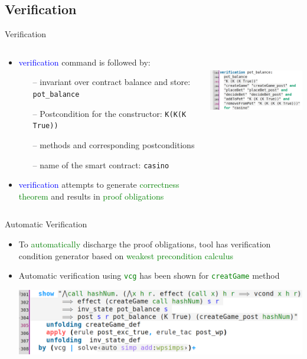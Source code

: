 \documentclass[aspectratio=169]{beamer}
\begin{document}
\subsection{Verification}
\begin{frame}{Verification}
\begin{columns}
\begin{column}{0.50\textwidth}
  \begin{itemize}
\item \textcolor{blue}{verification} command is followed by:
\begin{itemize}
\item[--] invariant over contract balance and store: \texttt{pot\_balance} 
\item[--] Postcondition for the constructor: \texttt{K(K(K True))}
\item[--] methods and corresponding postconditions 
\item[--] name of the smart contract: \texttt{casino}
\end{itemize}
\item \textcolor{blue}{verification} attempts to generate \textcolor{green}{correctness theorem} and results in \textcolor{green}{proof obligations}
\end{itemize}
\end{column}
\begin{column}{0.50\textwidth}  %
  \begin{center}
     \includegraphics[width=\textwidth, height=3cm, keepaspectratio]{ver_conract}
     \end{center}
\end{column}
\end{columns}
\end{frame}


\begin{frame}{Automatic Verification}
\begin{itemize}
\item To \textcolor{green}{automatically} discharge the proof obligations, tool has verification condition generator based on \textcolor{green}{weakest precondition calculus}
\item Automatic verification using \textcolor{green}{\texttt{vcg}} has been shown for \textcolor{green}{\texttt{creatGame}} method
\begin{center}\vspace{2mm}
		\includegraphics[width=.95\textwidth]{inv_contract.png}
	\end{center}\vspace{2mm}
\end{itemize}
\end{frame}
%
\end{document}
